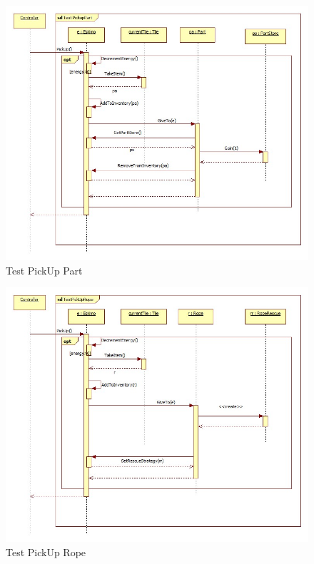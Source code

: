 \begin{figure}[H]
	\begin{center}
		\includegraphics[width=17cm]{chapters/chapter05/diagrams/TestPickUpPart.jpg}
		\caption{Test PickUp Part}
		\label{fig:Test PickUp Part}
	\end{center}
\end{figure}

\begin{figure}[H]
	\begin{center}
		\includegraphics[width=17cm]{chapters/chapter05/diagrams/TestPickUpRope.jpg}
		\caption{Test PickUp Rope}
		\label{fig:Test PickUp Rope}
	\end{center}
\end{figure}

